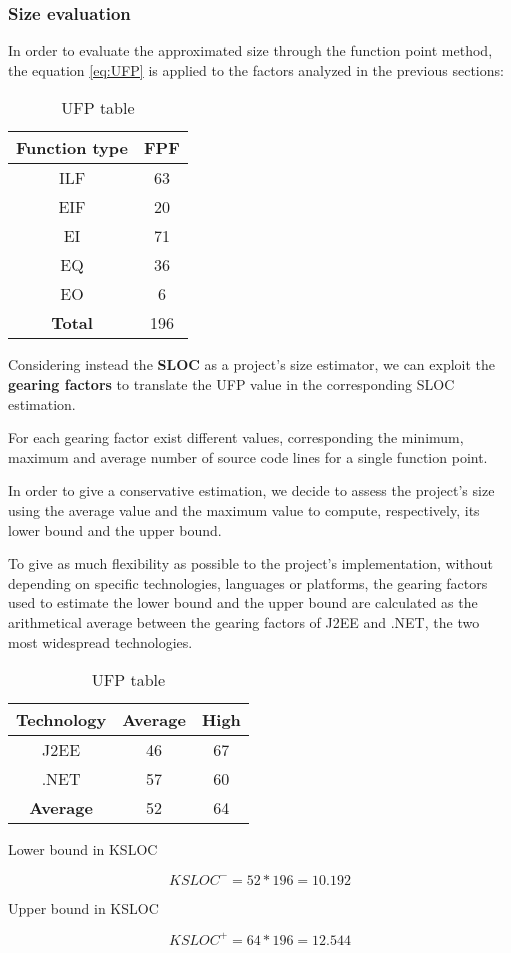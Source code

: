 \subsubsection{Size evaluation}

In order to evaluate the approximated size through the function point method, the equation \ref{eq:UFP} is applied to the factors analyzed in the previous sections:

\begin{table}[h!]
        \centering
        \begin{tabular}{|c|c|}
	\hline
	\textbf{Function type} & \textbf{FPF} \\
	\hline
        ILF & 63 \\
	EIF & 20 \\
	EI & 71 \\
	EQ & 36 \\
	EO & 6 \\
	\hline
	\textbf{Total} & 196 \\
	\hline
	\end{tabular}
        \caption{UFP table}
        \label{table:UFPT}
\end{table}

Considering instead the \textbf{SLOC} as a project's size estimator, we can exploit the \textbf{gearing factors} to translate the UFP value in the corresponding SLOC estimation.

For each gearing factor exist different values, corresponding the minimum, maximum and average number of source code lines for a single function point. 

In order to give a conservative estimation, we decide to assess the project's size using the average value and the maximum value to compute, respectively, its lower bound and the upper bound.

To give as much flexibility as possible to the project's implementation, without depending on specific technologies, languages or platforms, the gearing factors used to estimate the lower bound and the upper bound are calculated as the
arithmetical average between the gearing factors of J2EE and .NET, the two most widespread technologies.

\begin{table}[h!]
        \centering
        \begin{tabular}{|c|c|c|}
	\hline
	\textbf{Technology} & \textbf{Average} & \textbf{High} \\
	\hline
        J2EE & 46 & 67 \\
        .NET & 57 & 60 \\
	\hline
        \textbf{Average} & 52 & 64 \\
	\hline
        \end{tabular}
        \caption{UFP table}
        \label{table:UFPT}
\end{table}

Lower bound in KSLOC

\begin{displaymath}
	KSLOC^- =  52 * 196 = 10.192
\end{displaymath}

Upper bound in KSLOC

\begin{displaymath}
	KSLOC^+ = 64 * 196 = 12.544
\end{displaymath}
